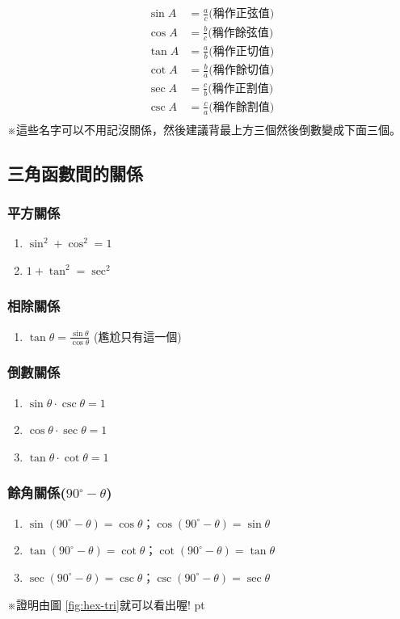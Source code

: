 \begin{align*}
\sin A &= \frac{a}{c} \mbox{(稱作正弦值)} \\
\cos A &= \frac{b}{c} \mbox{(稱作餘弦值)} \\
\tan A &= \frac{a}{b} \mbox{(稱作正切值)} \\
\cot A &= \frac{b}{a} \mbox{(稱作餘切值)} \\
\sec A &= \frac{c}{b} \mbox{(稱作正割值)} \\
\csc A &= \frac{c}{a} \mbox{(稱作餘割值)} \\
\end{align*}
※這些名字可以不用記沒關係，然後建議背最上方三個然後倒數變成下面三個。

\subsection{三角函數間的關係}
\subsubsection{平方關係}
\begin{enumerate}
\item ${\sin}^2 + {\cos}^2 = 1$
\item $1 + {\tan}^2 = {\sec}^2$
\end{enumerate}
\subsubsection{相除關係}
\begin{enumerate}
\item $\tan \theta = \frac{\sin \theta}{\cos \theta}$ (尷尬只有這一個)
\end{enumerate}
\subsubsection{倒數關係}
\begin{enumerate}
\item $\sin \theta \cdot \csc \theta = 1$
\item $\cos \theta \cdot \sec \theta = 1$
\item $\tan \theta \cdot \cot \theta = 1$
\end{enumerate}
\subsubsection{餘角關係($90^\circ - \theta$)}
\begin{enumerate}
\item $\sin (90^\circ-\theta) = \cos \theta$；$\cos (90^\circ-\theta) = \sin \theta$
\item $\tan (90^\circ-\theta) = \cot \theta$；$\cot (90^\circ-\theta) = \tan \theta$
\item $\sec (90^\circ-\theta) = \csc \theta$；$\csc (90^\circ-\theta) = \sec \theta$
\end{enumerate}
※證明由圖 \ref{fig:hex-tri}就可以看出喔!  pt

